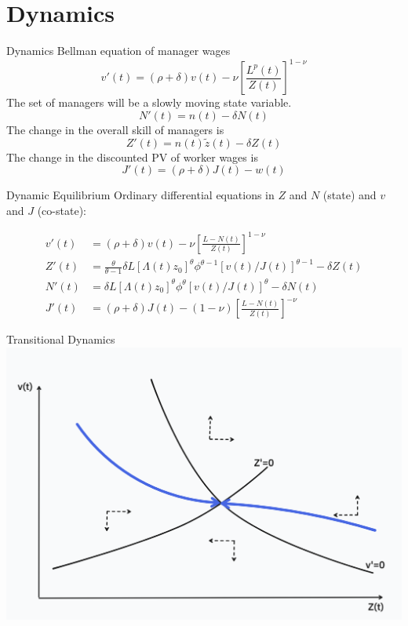 \documentclass[
  ignorenonframetext,
  aspectratio=1610,
]{beamer}
\begin{document}
\section{Dynamics}\label{dynamics}

\begin{frame}{Dynamics}
\protect\hypertarget{dynamics-1}{}
Bellman equation of manager wages
\[v'(t) = (\rho+\delta) v(t) - \nu \left[\frac {L^{p}(t)}{Z(t)}\right]^{1-\nu}\]
The set of managers will be a slowly moving state variable.
\[N'(t) = n(t) - \delta N(t)\] The change in the overall skill of
managers is \[Z'(t) = n(t)\tilde z(t) - \delta Z(t)\] The change in the
discounted PV of worker wages is \[J'(t)=(\rho+\delta)J(t)-w(t)\]
\end{frame}

\begin{frame}{Dynamic Equilibrium}
\protect\hypertarget{dynamic-equilibrium}{}
Ordinary differential equations in \(Z\) and \(N\) (state) and \(v\) and
\(J\) (co-state):

\begin{align*}
v'(t) &= (\rho+\delta) v(t) - \nu \left[\frac {L - N(t)}{Z(t)}\right]^{1-\nu} \\
Z'(t) &= \frac{\theta}{\theta-1} \delta L [\Lambda(t)z_0]^\theta \phi^{\theta-1} [v(t)/J(t)]^{\theta-1} - \delta Z(t) \\
N'(t) &= \delta L [\Lambda(t)z_0]^\theta \phi^{\theta} [v(t)/J(t)]^\theta - \delta N(t) \\
J'(t) &= (\rho+\delta) J(t) - (1-\nu) \left[\frac {L - N(t)}{Z(t)}\right]^{-\nu}
\end{align*}
\end{frame}

\begin{frame}{Transitional Dynamics}
\protect\hypertarget{transitional-dynamics}{}
\includegraphics{fig/phase1.png}
\end{frame}
\end{document}
